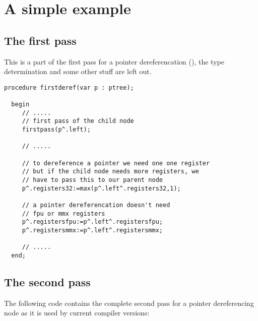 \documentclass{report}
\begin{document}
\section{A simple example}

\subsection{The first pass}

This is a part of the first pass for a pointer dereferencation
(), the type determination and some other stuff are left out.

\begin{verbatim}
procedure firstderef(var p : ptree);

  begin
     // .....
     // first pass of the child node
     firstpass(p^.left);

     // .....

     // to dereference a pointer we need one one register
     // but if the child node needs more registers, we
     // have to pass this to our parent node
     p^.registers32:=max(p^.left^.registers32,1);

     // a pointer dereferencation doesn't need
     // fpu or mmx registers
     p^.registersfpu:=p^.left^.registersfpu;
     p^.registersmmx:=p^.left^.registersmmx;

     // .....
  end;
\end{verbatim}

\subsection{The second pass}

The following code contains the complete second pass for
a pointer dereferencing node as it is used by current
compiler versions:
\end{document}
